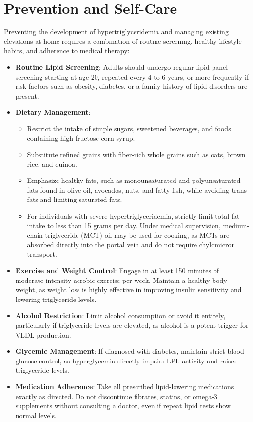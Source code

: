 \section*{Prevention and Self-Care}
Preventing the development of hypertriglyceridemia and managing existing elevations at home requires a combination of routine screening, healthy lifestyle habits, and adherence to medical therapy:
\begin{itemize}
    \item \textbf{Routine Lipid Screening}: Adults should undergo regular lipid panel screening starting at age 20, repeated every 4 to 6 years, or more frequently if risk factors such as obesity, diabetes, or a family history of lipid disorders are present.
    \item \textbf{Dietary Management}:
    \begin{itemize}
        \item Restrict the intake of simple sugars, sweetened beverages, and foods containing high-fructose corn syrup.
        \item Substitute refined grains with fiber-rich whole grains such as oats, brown rice, and quinoa.
        \item Emphasize healthy fats, such as monounsaturated and polyunsaturated fats found in olive oil, avocados, nuts, and fatty fish, while avoiding trans fats and limiting saturated fats.
        \item For individuals with severe hypertriglyceridemia, strictly limit total fat intake to less than 15 grams per day. Under medical supervision, medium-chain triglyceride (MCT) oil may be used for cooking, as MCTs are absorbed directly into the portal vein and do not require chylomicron transport.
    \end{itemize}
    \item \textbf{Exercise and Weight Control}: Engage in at least 150 minutes of moderate-intensity aerobic exercise per week. Maintain a healthy body weight, as weight loss is highly effective in improving insulin sensitivity and lowering triglyceride levels.
    \item \textbf{Alcohol Restriction}: Limit alcohol consumption or avoid it entirely, particularly if triglyceride levels are elevated, as alcohol is a potent trigger for VLDL production.
    \item \textbf{Glycemic Management}: If diagnosed with diabetes, maintain strict blood glucose control, as hyperglycemia directly impairs LPL activity and raises triglyceride levels.
    \item \textbf{Medication Adherence}: Take all prescribed lipid-lowering medications exactly as directed. Do not discontinue fibrates, statins, or omega-3 supplements without consulting a doctor, even if repeat lipid tests show normal levels.
\end{itemize}

